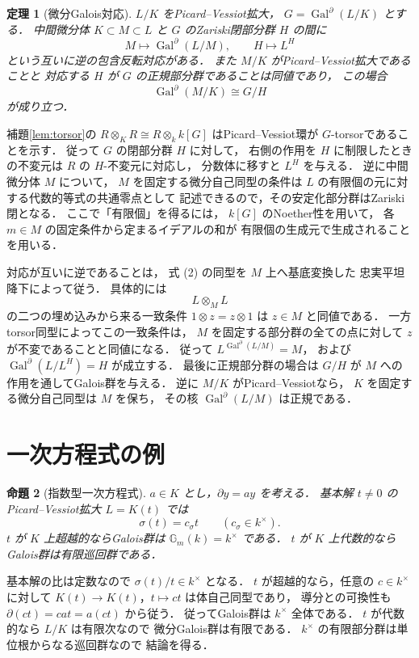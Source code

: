 \documentclass[a5paper,10pt,onecolumn]{jsarticle}
\makeatletter
\theoremstyle{mathnotetheorem}
\newtheorem{theorem}{定理}[section]
\newtheorem{proposition}[theorem]{命題}
\renewcommand{\proofname}{証明}
\renewenvironment{proof}[1][\proofname]{%
  \par\pushQED{\qed}\normalfont\topsep4\p@\@plus2\p@\relax
  \trivlist\item[\hskip\labelsep\bfseries #1]\ignorespaces
}{\popQED\endtrivlist\@endpefalse}
\makeatother
\begin{document}
\begin{theorem}[微分Galois対応]\label{thm:correspondence}
$L/K$ をPicard--Vessiot拡大，
$G=\operatorname{Gal}^\partial(L/K)$ とする．
中間微分体 $K\subset M\subset L$ と
$G$ のZariski閉部分群 $H$ の間に
\[
 M\longmapsto\operatorname{Gal}^\partial(L/M),
 \qquad H\longmapsto L^H
\]
という互いに逆の包含反転対応がある．
また $M/K$ がPicard--Vessiot拡大であることと
対応する $H$ が $G$ の正規部分群であることは同値であり，
この場合
\[
 \operatorname{Gal}^\partial(M/K)\cong G/H
\]
が成り立つ．
\end{theorem}
\begin{proof}
補題\ref{lem:torsor}の
$R\otimes_KR\cong R\otimes_k k[G]$
はPicard--Vessiot環が $G$-torsorであることを示す．
従って $G$ の閉部分群 $H$ に対して，
右側の作用を $H$ に制限したときの不変元は
$R$ の $H$-不変元に対応し，
分数体に移すと $L^H$ を与える．
逆に中間微分体 $M$ について，
$M$ を固定する微分自己同型の条件は
$L$ の有限個の元に対する代数的等式の共通零点として
記述できるので，その安定化部分群はZariski閉となる．
ここで「有限個」を得るには，
$k[G]$ のNoether性を用いて，
各 $m\in M$ の固定条件から定まるイデアルの和が
有限個の生成元で生成されることを用いる．

対応が互いに逆であることは，
式 (2) の同型を $M$ 上へ基底変換した
忠実平坦降下によって従う．
具体的には
\[
 L\otimes_ML
\]
の二つの埋め込みから来る一致条件
$1\otimes z=z\otimes1$ は
$z\in M$ と同値である．
一方torsor同型によってこの一致条件は，
$M$ を固定する部分群の全ての点に対して
$z$ が不変であることと同値になる．
従って
$L^{\operatorname{Gal}^\partial(L/M)}=M$，
および
$\operatorname{Gal}^\partial(L/L^H)=H$ が成立する．
最後に正規部分群の場合は $G/H$ が
$M$ への作用を通してGalois群を与える．
逆に $M/K$ がPicard--Vessiotなら，
$K$ を固定する微分自己同型は $M$ を保ち，
その核 $\operatorname{Gal}^\partial(L/M)$ は正規である．
\end{proof}

\section{一次方程式の例}

\begin{proposition}[指数型一次方程式]
\label{prop:exp-example}
$a\in K$ とし，$\partial y=ay$ を考える．
基本解 $t\ne0$ のPicard--Vessiot拡大 $L=K(t)$ では
\[
 \sigma(t)=c_\sigma t\qquad(c_\sigma\in k^\times).
\]
$t$ が $K$ 上超越的ならGalois群は
$\mathbb G_m(k)=k^\times$ である．
$t$ が $K$ 上代数的ならGalois群は有限巡回群である．
\end{proposition}
\begin{proof}
基本解の比は定数なので
$\sigma(t)/t\in k^\times$ となる．
$t$ が超越的なら，任意の $c\in k^\times$ に対して
$K(t)\to K(t)$，$t\mapsto ct$ は体自己同型であり，
導分との可換性も
$\partial(ct)=c at=a(ct)$ から従う．
従ってGalois群は $k^\times$ 全体である．
$t$ が代数的なら $L/K$ は有限次なので
微分Galois群は有限である．
$k^\times$ の有限部分群は単位根からなる巡回群なので
結論を得る．
\end{proof}
\end{document}
